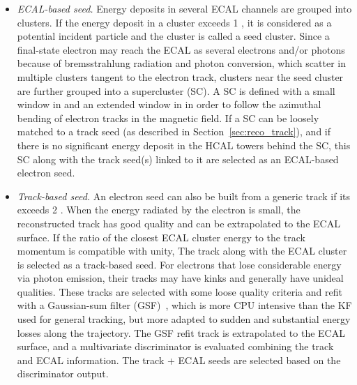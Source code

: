 \begin{itemize}
    \item \textit{ECAL-based seed.}
          Energy deposits in several ECAL channels are grouped into clusters. 
          If the energy deposit in a cluster exceeds 1 \GeV, 
          it is considered as a potential incident particle and the cluster is called a seed cluster.
          Since a final-state electron may reach the ECAL as several electrons and/or photons 
          because of bremsstrahlung radiation and photon conversion, which scatter in multiple clusters tangent to the electron track,
          clusters near the seed cluster are further grouped into a supercluster (SC).
          A SC is defined with a small window in \eta{} and an extended window in \phi{} 
          in order to follow the azimuthal bending of electron tracks in the magnetic field.
          If a SC can be loosely matched to a track seed (as described in Section~\ref{sec:reco_track}),
          and if there is no significant energy deposit in the HCAL towers behind the SC,
          this SC along with the track seed(s) linked to it are selected as an ECAL-based electron seed.

    \item \textit{Track-based seed.}
          An electron seed can also be built from a generic track if its \pt exceeds 2 \GeV.
          When the energy radiated by the electron is small, the reconstructed track has good quality 
          and can be extrapolated to the ECAL surface.
          If the ratio of the closest ECAL cluster energy to the track momentum is compatible with unity,
          The track along with the ECAL cluster is selected as a track-based seed.
          For electrons that lose considerable energy via photon emission, 
          their tracks may have kinks and generally have unideal qualities.
          These tracks are selected with some loose quality criteria and refit with a Gaussian-sum filter (GSF)~\cite{Adam_2005},
          which is more CPU intensive than the KF used for general tracking,
          but more adapted to sudden and substantial energy losses along the trajectory.
          The GSF refit track is extrapolated to the ECAL surface, 
          and a multivariate discriminator is evaluated combining the track and ECAL information.
          The track + ECAL seeds are selected based on the discriminator output. 

\end{itemize}

